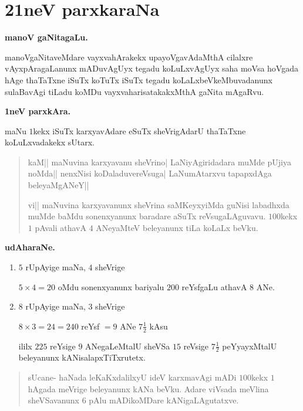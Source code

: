 
\chapter{21neV parxkaraNa}

\begin{center}
{\large\bf manoV gaNitagaLu.} 
\end{center}

manoVgaNitaveMdare vayxvahArakekx upayoVgavAdaMthA cilalxre vAyxpAragaLanunx mADuvAgUyx tegadu koLuLxvAgUyx saha moVsa hoVgada hAge thaTaTxne iSuTx koTuTx iSuTx tegadu koLaLxbeVkeMbuvadanunx sulaBa\-vAgi tiLadu koMDu vayxvaharisatakakxMthA gaNita mAgaRvu.

\begin{center}
{\large\bf 1neV parxkAra.}
\end{center}

maNu $1$kekx iSuTx karxyavAdare eSuTx sheVrigAdarU thaTaTxne koLuLxvadakekx sUtarx.

\begin{verse}
kaM|| maNuvina karxyavanu sheVrino| LaNiyAgiridadara muMde pUjiya noMda|| nenxNisi koDaladuvereVsuga| LaNumAtarxvu tapapxdAga beleyaMgANeY||

vi|| maNuvina karxyavanunx sheVrina saMKeyxyiMda guNisi labadhxda muMde baMdu sonenxyanunx baradare aSuTx reVsugaLAguvavu. $100$kekx $1$ pAvali athavA $4$ ANeyaMteV beleyanunx tiLa koLaLx beVku.
\end{verse}

\begin{center}
{\large\bf udAharaNe.}
\end{center}

\begin{enumerate}[\rm(1)]
\item $5$ rUpAyige maNa, $4$ sheVrige

\hfill $5 \times 4=20$ oMdu sonenxyanunx bariyalu $200$ 
reYsfgaLu athavA $8$ ANe.

\item $8$ rUpAyige maNa, $3$ sheVrige

\hfill $8 \times 3= 24 = 240$ reYsf $=9$ ANe $7\frac{1}{2}$ kAsu 

ililx $225$ reYsige $9$ ANegaLeMtalU sheVSa $15$ reVsige $7\frac{1}{2}$ peYyayxMtalU beleyanunx kANisalapxTiTxrutetx.
\end{enumerate}

\begin{verse}
sUcane- haNada leKaKxdalilxyU ideV karxmavAgi mADi $100$kekx $1$ hAgada meVrige beleyanunx kANa beVku. Adare viVsada meVlina sheVSavanunx $6$ pAlu mADikoMDare kANigaLAgutatxve.
\end{verse}

